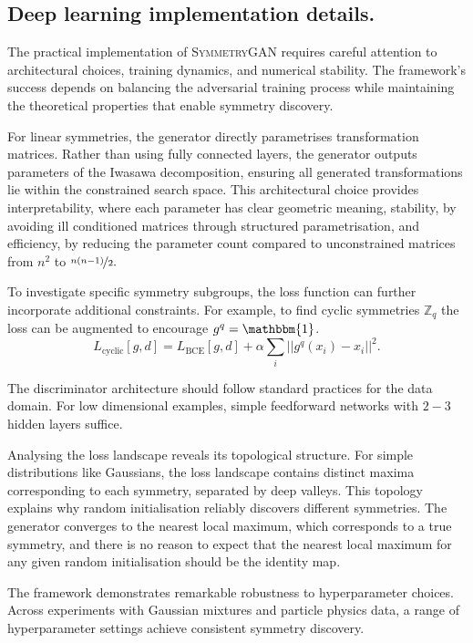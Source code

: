 \subsection{Deep learning implementation details.}

    The practical implementation of \textsc{SymmetryGAN} requires careful attention to architectural choices, training dynamics, and numerical stability.
    The framework's success depends on balancing the adversarial training process while maintaining the theoretical properties that enable symmetry discovery.
    
    For linear symmetries, the generator directly parametrises transformation matrices.
    Rather than using fully connected layers, the generator outputs parameters of the Iwasawa decomposition, ensuring all generated transformations lie within the constrained search space.
    This architectural choice provides interpretability, where each parameter has clear geometric meaning, stability, by avoiding ill conditioned matrices through structured parametrisation, and efficiency, by reducing the parameter count compared to unconstrained matrices from \(n^2\) to \(\nicefrac{n(n-1)}{2}.\)

    To investigate specific symmetry subgroups, the loss function can further incorporate additional constraints.
    For example, to find cyclic symmetries \(\mathbb{Z}_q\) the loss can be augmented to encourage \(g^q = \mathbbm{1}\).
    \[
        \label{eq:cyclic-loss}
        L_{\text{cyclic}}[g,d] = L_{\text{BCE}}[g,d] + \alpha \sum_{i} ||g^q(x_i) - x_i||^2.
    \]

    The discriminator architecture should follow standard practices for the data domain.
    For low dimensional examples, simple feedforward networks with \(2-3\) hidden layers suffice.

    Analysing the loss landscape reveals its topological structure.
    For simple distributions like Gaussians, the loss landscape contains distinct maxima corresponding to each symmetry, separated by deep valleys.
    This topology explains why random initialisation reliably discovers different symmetries.
    The generator converges to the nearest local maximum, which corresponds to a true symmetry, and there is no reason to expect that the nearest local maximum for any given random initialisation should be the identity map.

    The framework demonstrates remarkable robustness to hyperparameter choices.
    Across experiments with Gaussian mixtures and particle physics data, a range of hyperparameter settings achieve consistent symmetry discovery.

